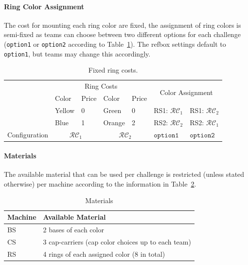 \documentclass[12pt,twoside]{article}
\newcommand{\reftab}[1]{Table~\ref{#1}}
\begin{document}
\paragraph{Ring Color Assignment}
The cost for mounting each ring color are fixed, the assignment of ring colors
is semi-fixed as teams can choose between two different options for each
challenge (\texttt{option1} or \texttt{option2} according to
\reftab{tab:ring-costs}).
The \ac{refbox} settings default to \texttt{option1}, but teams may change this
accordingly.

\newcommand{\colconfig}{\mathcal{RC}}
\begin{table}[!htb]
 \centering
 \begin{tabular}{l|l|l||l|l||l|l}
  & \multicolumn{4}{c||}{Ring Costs}
  & \multicolumn{2}{c}{\multirow{2}{*}{Color Assignment }}\\\cline{2-5}
  & Color  & Price & Color  & Price & \multicolumn{2}{c}{}\\\cline{2-7}
  & Yellow & 0 & Green & 0
  & \ac{RS}1: $\colconfig_1$ & \ac{RS}1: $\colconfig_2$ \\
  & Blue  & 1 & Orange & 2
  & \ac{RS}2: $\colconfig_2$ & \ac{RS}2: $\colconfig_1$ \\\hline\hline
  Configuration & \multicolumn{2}{c||}{$\colconfig_1$}
  & \multicolumn{2}{c||}{$\colconfig_2$}
  & $\texttt{option1}$ & $\texttt{option2}$\\
 \end{tabular}
 \caption{Fixed ring costs.}
 \label{tab:ring-costs}
\end{table}


\paragraph{Materials}\label{sec:materials}
The available material that can be used per challenge is restricted
(unless stated otherwise) per machine according to the information in
\reftab{tab:materials}.
\begin{table}[!htb]
 \centering
  \begin{tabularx}{\linewidth}{l|l}
   Machine & Available Material  \\\hline
   \ac{BS} & 2 bases of each color \\
   \ac{CS} & 3 cap-carriers (cap color choices up to each team)  \\
   \ac{RS} & 4 rings of each assigned color (8 in total)  \\
  \end{tabularx}
 \caption{Materials}
 \label{tab:materials}
\end{table}
\end{document}
